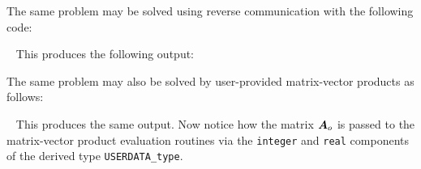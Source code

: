 \documentclass{galahad}
\begin{document}
The same problem may be solved using reverse communication with the
following code:

{\tt \small
\VerbatimInput{\packageexampleb}
}
\noindent
This produces the following output: \vspace*{-2mm}
{\tt \small
\VerbatimInput{\packageresultsb}
}
\noindent

The same problem may also be solved by user-provided matrix-vector
products as follows:

{\tt \small
\VerbatimInput{\packageexamplec}
}
\noindent
This produces the same output.
Now notice how the matrix ${\bm{A}}_o$ is passed to the matrix-vector product
evaluation routines via the {\tt integer} and
{\tt real} components of the derived type {\tt USERDATA\_type}.

\end{document}
